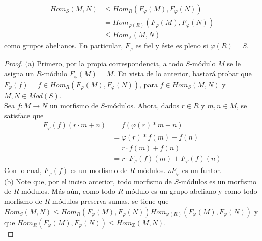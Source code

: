 \documentclass{article}
\newcommand{\lrprth}[1]{
	\left(#1\right)
}
\newcommand{\ringmodhom}[3]{
	Hom_{#1}\lrprth{#2,#3}
}
\theoremstyle{definition}
\theoremstyle{plain}
\theoremstyle{plain}
\theoremstyle{definition}
\theoremstyle{definition}
\theoremstyle{definition}
\theoremstyle{definition}
\theoremstyle{definition}
\theoremstyle{definition}
\begin{document}
\begin{enumerate}[label=\textbf{Ej \arabic*.}]
\begin{enumerate}
	\begin{align*}
		\ringmodhom{S}{M}{N} &\leq \ringmodhom{R}{F_{\varphi}\lrprth{M}}{F_{\varphi}\lrprth{N}}\\
		&= \ringmodhom{\varphi \lrprth{R}}{F_{\varphi}\lrprth{M}}{F_{\varphi}\lrprth{N}}\\
		&\leq \ringmodhom{\mathbb{Z}}{M}{N}
	\end{align*}
	como grupos abelianos. En particular, $F_{\varphi}$ es fiel y éste es pleno si $\varphi \lrprth{R}=S$.
\end{enumerate}
\begin{proof}
	$\boxed{\text{(a)}}$ Primero, por la propia correspondencia, a todo $S$-módulo $M$ se le asigna un $R$-módulo $F_{\varphi} \lrprth{M}=M$. En vista de lo anterior, bastará probar que $F_{\varphi}\lrprth{f} = f \in \ringmodhom{R}{F_{\varphi}\lrprth{M}}{F_{\varphi}\lrprth{N}}$, para $f \in \ringmodhom{S}{M}{N}$ y $M,N \in Mod\lrprth{S}$.\\
	
	Sea $f:M \longrightarrow N$ un morfismo de $S$-módulos. Ahora, dados $r \in R$ y $m,n \in M$, se satisface que
	\begin{align*}
		F_{\varphi}\lrprth{f}\lrprth{r \cdot m + n}&=f\lrprth{\varphi\lrprth{r}*m+n}\\
		&=\varphi \lrprth{r}*f\lrprth{m}+f\lrprth{n}\\
		&=r \cdot f\lrprth{m}+f\lrprth{n}\\
		&=r \cdot F_{\varphi} \lrprth{f}\lrprth{m}+F_{\varphi} \lrprth{f}\lrprth{n}
	\end{align*}
	Con lo cual, $F_{\varphi} \lrprth{f}$ es un morfismo de $R$-módulos. $\therefore F_{\varphi}$ es un funtor.\\
	
	$\boxed{\text{(b)}}$ Note que, por el inciso anterior, todo morfismo de $S$-módulos es un morfismo de $R$-módulos. Más aún, como todo $R$-módulo es un grupo abeliano y como todo morfismo de $R$-módulos preserva sumas, se tiene que $\ringmodhom{S}{M}{N}\leq\ringmodhom{R}{F_{\varphi}\lrprth{M}}{F_{\varphi}\lrprth{N}}\ringmodhom{\varphi \lrprth{R}}{F_{\varphi}\lrprth{M}}{F_{\varphi}\lrprth{N}}$ y que $\ringmodhom{R}{F_{\varphi}\lrprth{M}}{F_{\varphi}\lrprth{N}} \leq \ringmodhom{\mathbb{Z}}{M}{N}$.\\
	

\end{proof}
\end{enumerate}
\end{document}
